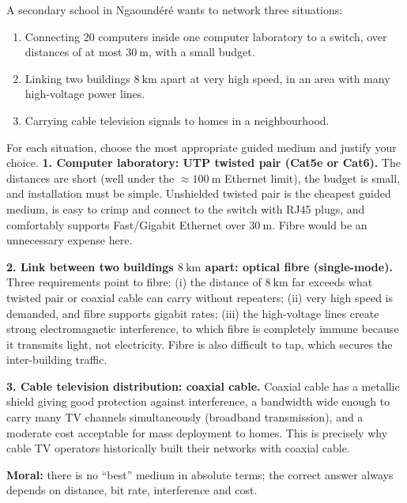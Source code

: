 \documentclass[11pt]{article}
\begin{document}
\begin{exoresolu}
A secondary school in Ngaound\'er\'e wants to network three situations:
\begin{enumerate}
\item Connecting $20$ computers inside one computer laboratory to a switch, over distances of at most $30\ \mathrm{m}$, with a small budget.
\item Linking two buildings $8\ \mathrm{km}$ apart at very high speed, in an area with many high-voltage power lines.
\item Carrying cable television signals to homes in a neighbourhood.
\end{enumerate}
For each situation, choose the most appropriate guided medium and justify your choice.
\tcblower
\textbf{1. Computer laboratory: UTP twisted pair (Cat5e or Cat6).} The distances are short (well under the $\approx 100\ \mathrm{m}$ Ethernet limit), the budget is small, and installation must be simple. Unshielded twisted pair is the cheapest guided medium, is easy to crimp and connect to the switch with RJ45 plugs, and comfortably supports Fast/Gigabit Ethernet over $30\ \mathrm{m}$. Fibre would be an unnecessary expense here.

\textbf{2. Link between two buildings $8\ \mathrm{km}$ apart: optical fibre (single-mode).} Three requirements point to fibre: (i) the distance of $8\ \mathrm{km}$ far exceeds what twisted pair or coaxial cable can carry without repeaters; (ii) very high speed is demanded, and fibre supports gigabit rates; (iii) the high-voltage lines create strong electromagnetic interference, to which fibre is completely immune because it transmits light, not electricity. Fibre is also difficult to tap, which secures the inter-building traffic.

\textbf{3. Cable television distribution: coaxial cable.} Coaxial cable has a metallic shield giving good protection against interference, a bandwidth wide enough to carry many TV channels simultaneously (broadband transmission), and a moderate cost acceptable for mass deployment to homes. This is precisely why cable TV operators historically built their networks with coaxial cable.

\textbf{Moral:} there is no ``best'' medium in absolute terms; the correct answer always depends on distance, bit rate, interference and cost.
\end{exoresolu}
\end{document}
